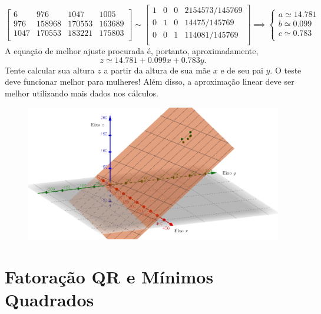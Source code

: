 \begin{ex}
\begin{equation}
\begin{bmatrix}
    6    & 976    & 1047   & 1005     \\
    976  & 158968 & 170553 & 163689   \\
    1047 & 170553 & 183221 & 175803   \\
  \end{bmatrix} \sim
  \begin{bmatrix}
    1 & 0 & 0  & 2154573/145769 \\
    0 & 1 & 0  & 14475/145769   \\
    0 & 0 & 1  & 114081/145769  \\
  \end{bmatrix} \implies
  \left\{
    \begin{array}{ll}
      a \simeq 14.781  \\
      b \simeq  0.099  \\
      c \simeq  0.783  \\
    \end{array}
  \right.
  \end{equation} A equação de melhor ajuste procurada é, portanto, aproximadamente,
  \begin{equation}
  z \simeq 14.781 + 0.099 x + 0.783 y.
  \end{equation} Tente calcular sua altura $z$ a partir da altura de sua mãe $x$ e de seu pai $y$. O teste deve funcionar melhor para mulheres! Além disso, a aproximação linear deve ser melhor utilizando mais dados nos cálculos.
  \begin{figure}[h!]
    \begin{center}
      \includegraphics[width=1\linewidth]{Semana13/semana13-alturas}
    \end{center}
  \end{figure}
\end{ex}

\section{Fatoração QR e Mínimos Quadrados}

